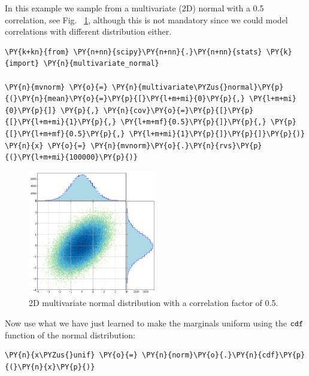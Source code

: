 In this example we sample from a multivariate (2D) normal with a 0.5 correlation, 
see Fig.~ \ref{fig:multivariate_with_correlation}, although this is not mandatory since
we could model correlations with different distribution either.

\begin{codebox}[breakable, size=fbox, boxrule=1pt, pad at break*=1mm,colback=cellbackground, colframe=cellborder]
\begin{Verbatim}[commandchars=\\\{\}]
\PY{k+kn}{from} \PY{n+nn}{scipy}\PY{n+nn}{.}\PY{n+nn}{stats} \PY{k}{import} \PY{n}{multivariate_normal}

\PY{n}{mvnorm} \PY{o}{=} \PY{n}{multivariate\PYZus{}normal}\PY{p}{(}\PY{n}{mean}\PY{o}{=}\PY{p}{[}\PY{l+m+mi}{0}\PY{p}{,} \PY{l+m+mi}{0}\PY{p}{]} \PY{p}{,} \PY{n}{cov}\PY{o}{=}\PY{p}{[}\PY{p}{[}\PY{l+m+mi}{1}\PY{p}{,} \PY{l+m+mf}{0.5}\PY{p}{]}\PY{p}{,} \PY{p}{[}\PY{l+m+mf}{0.5}\PY{p}{,} \PY{l+m+mi}{1}\PY{p}{]}\PY{p}{]}\PY{p}{)}
\PY{n}{x} \PY{o}{=} \PY{n}{mvnorm}\PY{o}{.}\PY{n}{rvs}\PY{p}{(}\PY{l+m+mi}{100000}\PY{p}{)}
\end{Verbatim}
\end{codebox}

\begin{figure}[hb]
  \centering
  \includegraphics[width=0.5\textwidth]{figures/lesson6_14_0.png}
  \caption{2D multivariate normal distribution with a correlation factor of 0.5.}
  \label{fig:multivariate_with_correlation}
\end{figure}
    
Now use what we have just learned to make the marginals uniform using
the \(\tt{cdf}\) function of the normal distribution:

\begin{codebox}[breakable, size=fbox, boxrule=1pt, pad at break*=1mm,colback=cellbackground, colframe=cellborder]
\begin{Verbatim}[commandchars=\\\{\}]
\PY{n}{x\PYZus{}unif} \PY{o}{=} \PY{n}{norm}\PY{o}{.}\PY{n}{cdf}\PY{p}{(}\PY{n}{x}\PY{p}{)}
\end{Verbatim}
\end{codebox}


